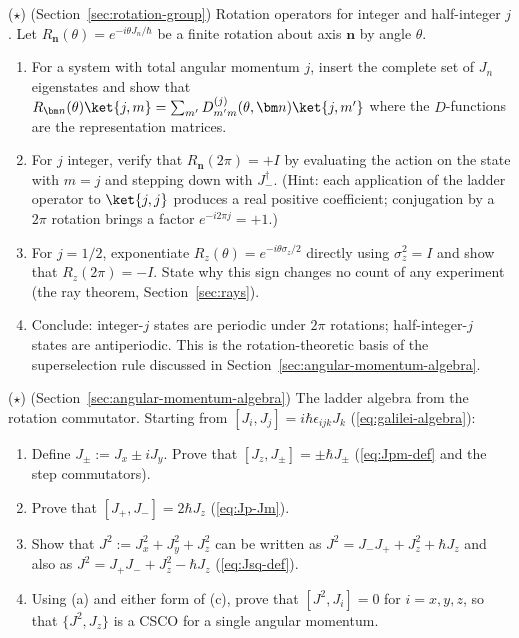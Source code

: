 \begin{problemset}

\item ($\star$) (Section~\ref{sec:rotation-group}) Rotation operators for integer and half-integer $j$. Let $R_{\bm n}(\theta) = e^{-i\theta J_n/\hbar}$ be a finite rotation about axis $\bm n$ by angle $\theta$.
\begin{enumerate}
\item[(a)] For a system with total angular momentum $j$, insert the complete set of $J_n$ eigenstates and show that $R_{\bm n}(\theta)\ket{j,m} = \sum_{m'} D^{(j)}_{m'm}(\theta,\bm n)\ket{j,m'}$ where the $D$-functions are the representation matrices.
\item[(b)] For $j$ integer, verify that $R_{\bm n}(2\pi) = +I$ by evaluating the action on the state with $m=j$ and stepping down with $J_-^\dagger$. (Hint: each application of the ladder operator to $\ket{j,j}$ produces a real positive coefficient; conjugation by a $2\pi$ rotation brings a factor $e^{-i2\pi j} = +1$.)
\item[(c)] For $j=1/2$, exponentiate $R_z(\theta) = e^{-i\theta\sigma_z/2}$ directly using $\sigma_z^2 = I$ and show that $R_z(2\pi) = -I$. State why this sign changes no count of any experiment (the ray theorem, Section~\ref{sec:rays}).
\item[(d)] Conclude: integer-$j$ states are periodic under $2\pi$ rotations; half-integer-$j$ states are antiperiodic. This is the rotation-theoretic basis of the superselection rule discussed in Section~\ref{sec:angular-momentum-algebra}.
\end{enumerate}

\item ($\star$) (Section~\ref{sec:angular-momentum-algebra}) The ladder algebra from the rotation commutator. Starting from $[J_i, J_j] = i\hbar\epsilon_{ijk}J_k$ (\eqref{eq:galilei-algebra}):
\begin{enumerate}
\item[(a)] Define $J_\pm := J_x \pm iJ_y$. Prove that $[J_z, J_\pm] = \pm\hbar J_\pm$ (\eqref{eq:Jpm-def} and the step commutators).
\item[(b)] Prove that $[J_+, J_-] = 2\hbar J_z$ (\eqref{eq:Jp-Jm}).
\item[(c)] Show that $J^2 := J_x^2 + J_y^2 + J_z^2$ can be written as $J^2 = J_-J_+ + J_z^2 + \hbar J_z$ and also as $J^2 = J_+J_- + J_z^2 - \hbar J_z$ (\eqref{eq:Jsq-def}).
\item[(d)] Using (a) and either form of (c), prove that $[J^2, J_i] = 0$ for $i = x,y,z$, so that $\{J^2, J_z\}$ is a CSCO for a single angular momentum.
\end{enumerate}


\end{problemset}
